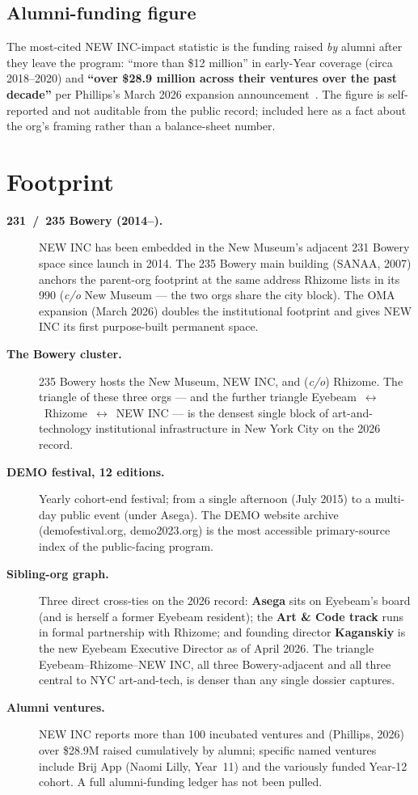 \documentclass[10pt,letterpaper,twocolumn]{article}
\begin{document}
\subsection{Alumni-funding figure}

The most-cited NEW INC-impact statistic is the funding raised \emph{by} alumni after they leave the program: ``more than \$12 million'' in early-Year coverage (circa 2018--2020) and \textbf{``over \$28.9 million across their ventures over the past decade''} per Phillips's March 2026 expansion announcement~\citep{theartnewspaper2026expansion}. The figure is self-reported and not auditable from the public record; included here as a fact about the org's framing rather than a balance-sheet number.

\section{Footprint}

\begin{description}
\item[\textbf{231~/~235 Bowery (2014--).}] NEW INC has been embedded in the New Museum's adjacent 231 Bowery space since launch in 2014. The 235 Bowery main building (SANAA, 2007) anchors the parent-org footprint at the same address Rhizome lists in its 990 (\emph{c/o} New Museum --- the two orgs share the city block). The OMA expansion (March 2026) doubles the institutional footprint and gives NEW INC its first purpose-built permanent space.
\item[\textbf{The Bowery cluster.}] 235 Bowery hosts the New Museum, NEW INC, and (\emph{c/o}) Rhizome. The triangle of these three orgs --- and the further triangle Eyebeam~$\leftrightarrow$~Rhizome~$\leftrightarrow$~NEW INC --- is the densest single block of art-and-technology institutional infrastructure in New York City on the 2026 record.
\item[\textbf{DEMO festival, 12 editions.}] Yearly cohort-end festival; from a single afternoon (July 2015) to a multi-day public event (under Asega). The DEMO website archive (demofestival.org, demo2023.org) is the most accessible primary-source index of the public-facing program.
\item[\textbf{Sibling-org graph.}] Three direct cross-ties on the 2026 record: \textbf{Asega} sits on Eyebeam's board (and is herself a former Eyebeam resident); the \textbf{Art \& Code track} runs in formal partnership with Rhizome; and founding director \textbf{Kaganskiy} is the new Eyebeam Executive Director as of April 2026. The triangle Eyebeam--Rhizome--NEW INC, all three Bowery-adjacent and all three central to NYC art-and-tech, is denser than any single dossier captures.
\item[\textbf{Alumni ventures.}] NEW INC reports more than 100 incubated ventures and (Phillips, 2026) over \$28.9M raised cumulatively by alumni; specific named ventures include Brij App (Naomi Lilly, Year~11) and the variously funded Year-12 cohort. A full alumni-funding ledger has not been pulled.
\end{description}
\end{document}
